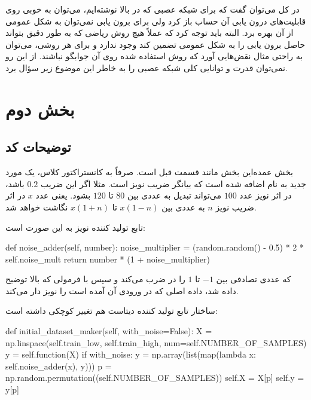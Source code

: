 \documentclass[12pt,titlepage,a4page , tikz , multi,table , svgnames,xcdraw]{article}
\begin{document}
در کل می‌توان گفت که برای شبکه عصبی که در بالا نوشته‌ایم، می‌توان به خوبی روی قابلیت‌های درون یابی آن حساب باز کرد ولی برای برون یابی نمی‌توان به شکل عمومی از آن بهره برد. البته باید توجه کرد که عملاً هیچ روش ریاضی که به طور دقیق بتواند حاصل برون یابی را به شکل عمومی تضمین کند وجود ندارد و برای هر روشی، می‌توان به راحتی مثال نقض‌هایی آورد که روش استفاده شده روی آن جوابگو نباشند. از این رو نمی‌توان قدرت و توانایی کلی شبکه عصبی را به خاطر این موضوع زیر سؤال برد.



\newpage

\section{بخش دوم}

\subsection{توضیحات کد}
بخش عمده‌این بخش مانند قسمت قبل است. صرفاً به کانستراکتور کلاس، یک مورد جدید به نام  اضافه شده است که بیانگر ضریب نویز است. مثلا اگر این ضریب $0.2$ باشد، در اثر نویز عدد $100$ می‌تواند تبدیل به عددی بین $80$ تا $120$ بشود. یعنی عدد $x$ در اثر ضریب نویز $n$ به عددی بین $x(1-n)$ تا $x(1+n)$ نگاشت خواهد شد.

تابع تولید کننده نویز به این صورت است:


\begin{latin}
\begin{python}[language=Python]

   def noise_adder(self, number):
        noise_multiplier = (random.random() - 0.5) * 2 * self.noise_mult
        return number * (1 + noise_multiplier)
\end{python}

\end{latin}

که عددی تصادفی بین $-1$ تا $1$ را در  ضرب می‌کند و سپس با فرمولی که بالا توضیح داده شد، داده اصلی که در ورودی آن آمده است را نویز دار می‌کند.

ساختار تابع تولید کننده دیتاست هم تغییر کوچکی داشته است:


\begin{latin}
\begin{python}[language=Python]

def initial_dataset_maker(self, with_noise=False):
        X = np.linspace(self.train_low, self.train_high, num=self.NUMBER_OF_SAMPLES)
        y = self.function(X)
        if with_noise:
            y = np.array(list(map(lambda x: self.noise_adder(x), y)))
        p = np.random.permutation((self.NUMBER_OF_SAMPLES))
        self.X = X[p]
        self.y = y[p]
\end{python}

\end{latin}
\end{document}
